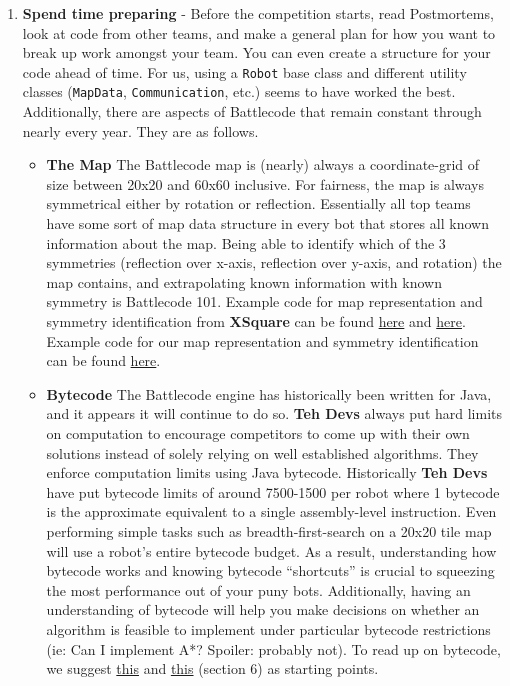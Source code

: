 \begin{enumerate}
  \item \textbf{Spend time preparing} - Before the competition starts, read Postmortems, look at code from other teams, and make a general plan for how you want to break up work amongst your team. You can even create a structure for your code ahead of time. For us, using a \verb|Robot| base class and different utility classes (\verb|MapData|, \verb|Communication|, etc.) seems to have worked the best. Additionally, there are aspects of Battlecode that remain constant through nearly every year. They are as follows.
  \begin{itemize}
      \item \textbf{The Map} The Battlecode map is (nearly) always a coordinate-grid of size between 20x20 and 60x60 inclusive. For fairness, the map is always symmetrical either by rotation or reflection. Essentially all top teams have some sort of map data structure in every bot that stores all known information about the map. Being able to identify which of the 3 symmetries (reflection over x-axis, reflection over y-axis, and rotation) the map contains, and extrapolating known information with known symmetry is Battlecode 101. Example code for map representation and symmetry identification from \textbf{XSquare} can be found \href{https://github.com/IvanGeffner/BC25/blob/master/basic45/Map.java}{here} and \href{https://github.com/IvanGeffner/BC25/blob/master/basic45/SymmetryManager.java}{here}. Example code for our map representation and symmetry identification can be found \href{https://github.com/justinottesen/battlecode25/blob/main/java/src/quals/util/MapData.java}{here}. 
      \item \textbf{Bytecode} The Battlecode engine has historically been written for Java, and it appears it will continue to do so. \textbf{Teh Devs} always put hard limits on computation to encourage competitors to come up with their own solutions instead of solely relying on well established algorithms. They enforce computation limits using Java bytecode. Historically \textbf{Teh Devs} have put bytecode limits of around 7500-1500 per robot where 1 bytecode is the approximate equivalent to a single assembly-level instruction. Even performing simple tasks such as breadth-first-search on a 20x20 tile map will use a robot's entire bytecode budget. As a result, understanding how bytecode works and knowing bytecode ``shortcuts'' is crucial to squeezing the most performance out of your puny bots. Additionally, having an understanding of bytecode will help you make decisions on whether an algorithm is feasible to implement under particular bytecode restrictions (ie: Can I implement A*? Spoiler: probably not). To read up on bytecode, we suggest \href{https://cory.li/bytecode-hacking/}{this} and \href{https://battlecode.org/assets/files/battlecode-guide-xsquare.pdf}{this} (section 6) as starting points.

\end{itemize}
\end{enumerate}
